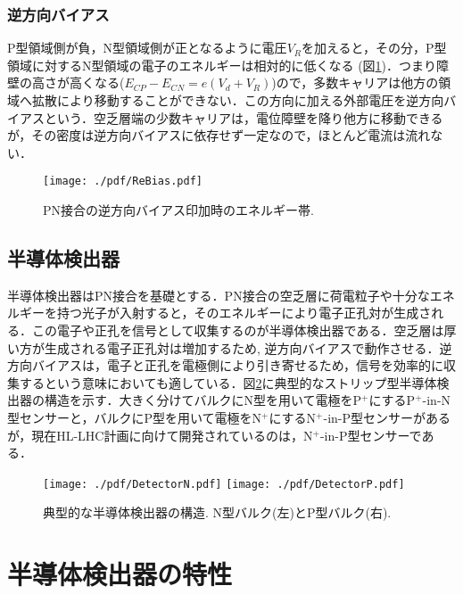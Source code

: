 \subsubsection*{逆方向バイアス}
P型領域側が負，N型領域側が正となるように電圧$V_{R}$を加えると，その分，P型領域に対するN型領域の電子のエネルギーは相対的に低くなる (図\ref{fig:ReBias})．つまり障壁の高さが高くなる($E_{CP}-E_{CN}=e(V_{d}+V_{R})$)ので，多数キャリアは他方の領域へ拡散により移動することができない．この方向に加える外部電圧を逆方向バイアスという．空乏層端の少数キャリアは，電位障壁を降り他方に移動できるが，その密度は逆方向バイアスに依存せず一定なので，ほとんど電流は流れない．\par
\begin{figure}[h]
	\centering
	\texttt{[image: ./pdf/ReBias.pdf]}
	\caption{PN接合の逆方向バイアス印加時のエネルギー帯.}
	\label{fig:ReBias}
\end{figure}
\subsection{半導体検出器}
半導体検出器はPN接合を基礎とする．PN接合の空乏層に荷電粒子や十分なエネルギーを持つ光子が入射すると，そのエネルギーにより電子正孔対が生成される．この電子や正孔を信号として収集するのが半導体検出器である．空乏層は厚い方が生成される電子正孔対は増加するため, 逆方向バイアスで動作させる．逆方向バイアスは，電子と正孔を電極側により引き寄せるため，信号を効率的に収集するという意味においても適している．図\ref{fig:Detector}に典型的なストリップ型半導体検出器の構造を示す．大きく分けてバルクにN型を用いて電極をP$^{+}$にするP$^{+}$-in-N型センサーと，バルクにP型を用いて電極をN$^{+}$にするN$^{+}$-in-P型センサーがあるが，現在HL-LHC計画に向けて開発されているのは，N$^{+}$-in-P型センサーである．\par
\begin{figure}[h]
	\centering
	\texttt{[image: ./pdf/DetectorN.pdf]}
	\texttt{[image: ./pdf/DetectorP.pdf]}
	\caption{典型的な半導体検出器の構造. N型バルク(左)とP型バルク(右).}
	\label{fig:Detector}
\end{figure}
\section{半導体検出器の特性}
